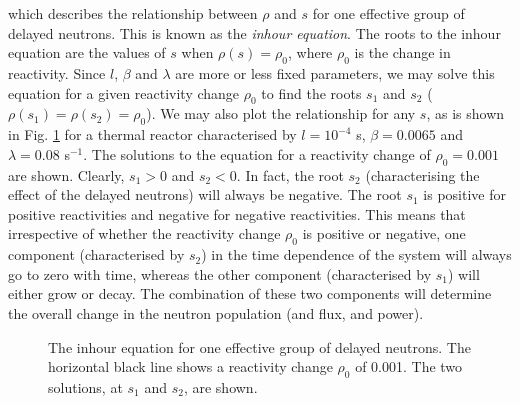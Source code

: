 which describes the relationship between $\rho$ and $s$ for one effective group of delayed neutrons. This is known as the \emph{inhour equation}. The roots to the inhour equation are the values of $s$ when $\rho(s) = \rho_0$, where $\rho_0$ is the change in reactivity. Since $l$, $\beta$ and $\lambda$ are more or less fixed parameters, we may solve this equation for a given reactivity change $\rho_0$ to find the roots $s_1$ and $s_2$ ($\rho(s_1) = \rho(s_2) = \rho_0$). We may also plot the relationship for any $s$, as is shown in Fig. \ref{fig:inhour_one_group} for a thermal reactor characterised by $l = 10^{-4}$ s, $\beta = 0.0065$ and $\lambda = 0.08$ s$^{-1}$. The solutions to the equation for a reactivity change of $\rho_0 = 0.001$ are shown. Clearly, $s_1 > 0$ and $s_2 < 0$. In fact, the root $s_2$ (characterising the effect of the delayed neutrons) will always be negative. The root $s_1$ is positive for positive reactivities and negative for negative reactivities. This means that irrespective of whether the reactivity change $\rho_0$ is positive or negative, one component (characterised by $s_2$) in the time dependence of the system will always go to zero with time, whereas the other component (characterised by $s_1$) will either grow or decay. The combination of these two components will determine the overall change in the neutron population (and flux, and power).
\begin{figure}[ht!]
\protect {}\protect
\caption{\label{fig:inhour_one_group} \footnotesize{The inhour equation for one effective group of delayed neutrons. The horizontal black line shows a reactivity change $\rho_0$ of 0.001. The two solutions, at $s_1$ and $s_2$, are shown.}}
\end{figure}

